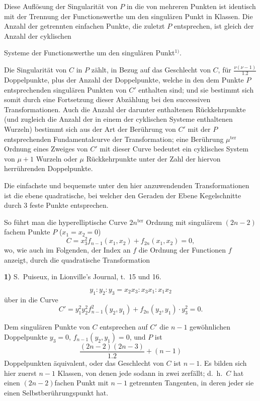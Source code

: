 \documentclass{article}
\begin{document}
Diese Auflösung der Singularität von $P$ in die von mehreren Punkten ist identisch mit der Trennung der Functionswerthe um den singulären Punkt in Klassen. Die Anzahl der getrennten einfachen Punkte, die zuletzt $P$ entsprechen, ist gleich der Anzahl der cyklischen

Systeme der Functionswerthe um den singulären Punkt${}^{1)}$.

Die Singularität von $C$ in $P$ zählt, in Bezug auf das Geschlecht von $C$, für $\frac{\nu(\nu-1)}{1.2}$ Doppelpunkte, plus der Anzahl der Doppelpunkte, welche in den dem Punkte $P$ entsprechenden singulären Punkten von $C'$ enthalten sind; und sie bestimmt sich somit durch eine Fortsetzung dieser Abzählung bei den successiven Transformationen. Auch die Anzahl der darunter enthaltenen Rückkehrpunkte (und zugleich die Anzahl der in einem der cyklischen Systeme enthaltenen Wurzeln) bestimmt sich aus der Art der Berührung von $C'$ mit der $P$ entsprechenden Fundamentalcurve der Transformation; eine Berührung $\mu^{\text{ter}}$ Ordnung eines Zweiges von $C'$ mit dieser Curve bedeutet ein cyklisches System von $\mu+1$ Wurzeln oder $\mu$ Rückkehrpunkte unter der Zahl der hiervon herrührenden Doppelpunkte.

Die einfachste und bequemste unter den hier anzuwendenden Transformationen ist die ebene quadratische, bei welcher den Geraden der Ebene Kegelschnitte durch 3 feste Punkte entsprechen.

So führt man die hyperelliptische Curve $2n^{\text{ter}}$ Ordnung mit singulärem $(2n-2)$fachem Punkte $P$ ($x_1 = x_2 = 0$)
\[ C = x_3^2 f_{n-1}(x_1, x_2) + f_{2n}(x_1, x_2) = 0, \]
wo, wie auch im Folgenden, der Index an $f$ die Ordnung der Functionen $f$ anzeigt, durch die quadratische Transformation

\textbf{1)} S.\ Puiseux, in Lionville's Journal, t.\ 15 und 16.

\[ y_1 : y_2 : y_3 = x_2 x_3 : x_3 x_1 : x_1 x_2 \]
über in die Curve
\[ C' = y_1^2 y_2^2 f_{n-1}^2(y_2, y_1) + f_{2n}(y_2, y_1) \cdot y_3^2 = 0. \]

Dem singulären Punkte von $C$ entsprechen auf $C'$ die $n-1$ gewöhnlichen Doppelpunkte $y_3 = 0$, $f_{n-1}(y_2, y_1) = 0$, und $P$ ist
\[ \frac{(2n-2)(2n-3)}{1.2} + (n-1) \]
Doppelpunkten äquivalent, oder das Geschlecht von $C$ ist $n-1$. Es bilden sich hier zuerst $n-1$ Klassen, von denen jede sodann in zwei zerfällt; d.\ h.\ $C$ hat einen $(2n-2)$fachen Punkt mit $n-1$ getrennten Tangenten, in deren jeder sie einen Selbstberührungspunkt hat.
\end{document}
